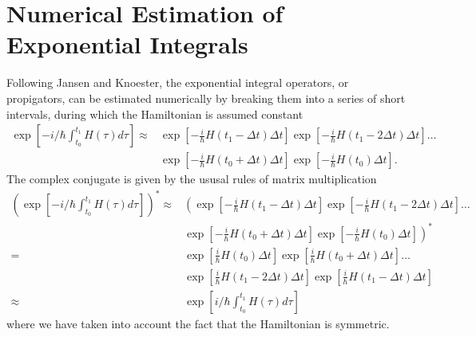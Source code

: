 \documentclass{article}
\begin{document}
\clearpage
\section{Numerical Estimation of Exponential Integrals}
Following Jansen and Knoester,\cite{Jansen2006} the exponential integral operators, or propigators, can be estimated numerically by breaking them into a series of short intervals, during which the Hamiltonian is assumed constant
\begin{equation}
\begin{split}
\exp\left[-i/\hbar\int_{t_{0}}^{t_{1}}H(\tau)d\tau\right]\approx&
\exp\left[-\frac{i}{\hbar}H(t_{1}-\Delta t)\Delta t\right]
\exp\left[-\frac{i}{\hbar}H(t_{1}-2\Delta t)\Delta t\right]
\ldots\\
&\exp\left[-\frac{i}{\hbar}H(t_{0}+\Delta t)\Delta t\right]
\exp\left[-\frac{i}{\hbar}H(t_{0})\Delta t\right].
\end{split}
\end{equation}
The complex conjugate is given by the ususal rules of matrix multiplication
\begin{equation}
\begin{split}
\left(\exp\left[-i/\hbar\int_{t_{0}}^{t_{1}}H(\tau)d\tau\right]\right)^{*}\approx&
\left(\exp\left[-\frac{i}{\hbar}H(t_{1}-\Delta t)\Delta t\right]
\exp\left[-\frac{i}{\hbar}H(t_{1}-2\Delta t)\Delta t\right]
\ldots\right.\\
&\left.\exp\left[-\frac{i}{\hbar}H(t_{0}+\Delta t)\Delta t\right]
\exp\left[-\frac{i}{\hbar}H(t_{0})\Delta t\right]\right)^{*}\\
=&\exp\left[\frac{i}{\hbar}H(t_{0})\Delta t\right]
\exp\left[\frac{i}{\hbar}H(t_{0}+\Delta t)\Delta t\right]
\ldots\\
&
\exp\left[\frac{i}{\hbar}H(t_{1}-2\Delta t)\Delta t\right]
\exp\left[\frac{i}{\hbar}H(t_{1}-\Delta t)\Delta t\right]\\
\approx&
\exp\left[i/\hbar\int_{t_{0}}^{t_{1}}H(\tau)d\tau\right]
\end{split}
\end{equation}
where we have taken into account the fact that the Hamiltonian is symmetric.


\clearpage


\end{document}
